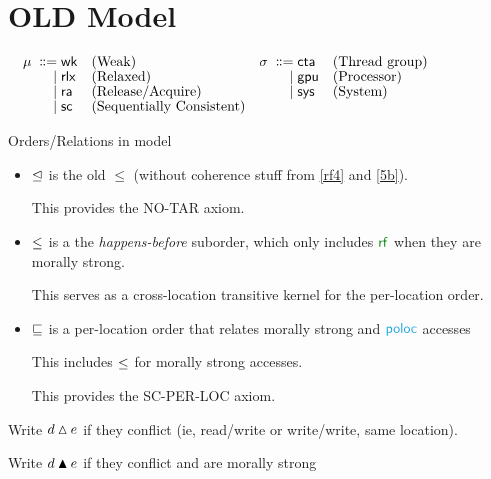 \section{OLD Model}

\begin{align*}
  \mu \;\mathrel{\mathord{\vcentcolon}\mkern-1mu\mathord{\vcentcolon}\mathord{{=}}}\;& {\mathsf{wk}} &&\text{{(Weak)}}                      &\sigma \;\mathrel{\mathord{\vcentcolon}\mkern-1mu\mathord{\vcentcolon}\mathord{{=}}}\;& {\mathsf{cta}} &&\text{(Thread group)} &\hbox{$\;\mkern60mu\;$}&
  \\[-1ex] \;\mathrel{|}\;& {\mathsf{rlx}} &&\text{{(Relaxed)}}                & \;\mathrel{|}\;&{\mathsf{gpu}}   &&\text{(Processor)}                                   
  \\[-1ex] \;\mathrel{|}\;& {\mathsf{ra}} &&\text{{(Release/Acquire)}}         & \;\mathrel{|}\;&{\mathsf{sys}}  &&\text{(System)}                                         
  \\[-1ex] \;\mathrel{|}\;& {\mathsf{sc}} &&\text{{(Sequentially Consistent)}}    
\end{align*}

Orders/Relations in model
\begin{itemize}
\item $\trianglelefteq$ is the old $\le$ (without coherence stuff from \ref{rf4} and \ref{5b}).

  This provides the NO-TAR axiom.
\item $\le$ is a the \emph{happens-before} suborder, which only includes $\rrf$ when they are morally strong.

  This serves as a cross-location transitive kernel for the per-location order.
  
\item $\sqsubseteq$ is a per-location order that relates morally strong  and $\rpoloc$ accesses

  This includes $\le$ for  morally strong accesses.

  This provides the SC-PER-LOC axiom.

\end{itemize}

Write $d\mathbin{\vartriangle}e$ if they conflict (ie, read/write or write/write, same location).

Write $d\mathbin{\blacktriangle}e$ if they conflict and are morally strong

